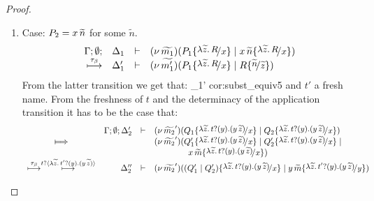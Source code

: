 \begin{proof}
\begin{enumerate}
	\noi \item Case: $P_2 = x\, {\widetilde{n}}$ for some $\widetilde{n}$.
%
\[
	\mhorel	{\Gamma}{\Delta_1}{\newsp{\widetilde{m_1}}{P_1 \subst{\abs{\widetilde{z}}{R}}{x} \Par \appl{x}{\widetilde{n}} \subst{\abs{\widetilde{z}}{R}}{x}}}
		{\hby{\btau}}{\Delta_1'}{}{\newsp{\widetilde{m_1'}}{P_1 \subst{\abs{\widetilde{z}}{R}}{x} \Par R \subst{\widetilde{n}}{\widetilde{z}}}} %
\]
%
	\noi From the latter transition we get that:
%
	{}
	{\hby{\btau} }
	{\Delta_1'}{}
	{cor:subst_equiv5}
%
%
	\noi and $t'$ a fresh name. From the freshness of $t$
	and the determinacy of the application transition
	it has to be the case that:
%
	\[
		\begin{array}{crll}
			& \Gamma; \es; \Delta_2'& \proves &
			\newsp{\widetilde{m_2}'}{Q_1 \subst{\auxtr{t}}{x} \Par Q_2 \subst{\auxtr{t}}{x}}\\
			\Hby{} && &
			\newsp{\widetilde{m_2}'}{Q_1' \subst{\auxtr{t}}{x} \Par Q_2' \subst{\auxtr{t}}{x} \Par \\
			&&& \qquad \qquad \appl{x}{\widetilde{m}} \subst{\auxtr{t}}{x}} \\
			\hby{\btau} \hby{\bactinp{t}{\auxtr{t'}}}
			& \Delta_2''& \proves& \newsp{\widetilde{m_2}'}{(Q_1' \Par Q_2') \subst{\auxtr{t}}{x} \Par \appl{y}{\widetilde{m}} \subst{\auxtr{t'}}{y}}

\end{array}\]
\end{enumerate}
\end{proof}
